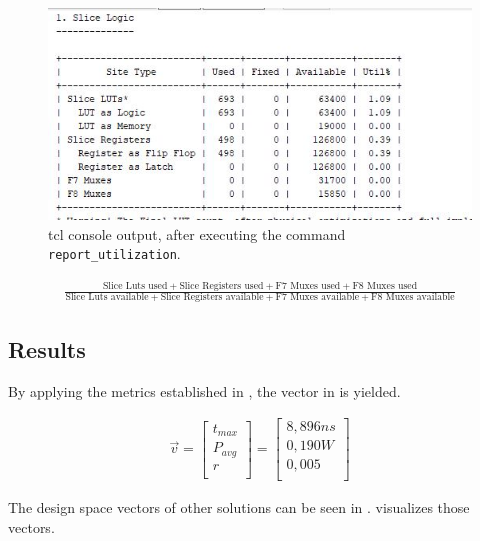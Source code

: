 \documentclass[%
	a4paper,
]
{article}
\begin{document}
\begin{figure}[h]
	\centering
	\includegraphics[width = \textwidth]{fig/resourceConsumption.jpg}
	\caption{tcl console output, after executing the command \lstinline{report_utilization}.}
	\label{fig:utilization}
\end{figure}

\begin{align}
        \frac{\textrm{Slice Luts used} + \textrm{Slice Registers used} + \textrm{F7 Muxes used} + \textrm{F8 Muxes used}}{\textrm{Slice Luts available} + \textrm{Slice Registers available} + \textrm{F7 Muxes available} + \textrm{F8 Muxes available}} \label{math:util}
\end{align}

\subsection*{Results}
By applying the metrics established in , the vector in  is yielded.


\begin{align}
	\vec{v} =
		\begin{bmatrix}
		t_{max}  \\
		P_{avg}\\
		r  \\
	\end{bmatrix}
	=
    \begin{bmatrix}
		8,896 ns  \\
		0,190 W\\
		0,005 	 \\
	\end{bmatrix} \label{math:vector}
\end{align}

The design space vectors of other solutions can be seen in .  visualizes those vectors.
\end{document}
